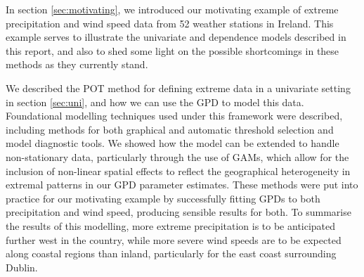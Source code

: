 \documentclass{article}
\numberwithin{equation}{section}
\begin{document}
In section \ref{sec:motivating}, we introduced our motivating example of extreme precipitation and wind speed data from 52 weather stations in Ireland. 
This example serves to illustrate the univariate and dependence models described in this report, and also to shed some light on the possible shortcomings in these methods as they currently stand.

We described the POT method for defining extreme data in a univariate setting in section \ref{sec:uni}, and how we can use the GPD to model this data. 
Foundational modelling techniques used under this framework were described, including methods for both graphical and automatic threshold selection and model diagnostic tools. 
We showed how the model can be extended to handle non-stationary data, particularly through the use of GAMs, which allow for the inclusion of non-linear spatial effects to reflect the  geographical heterogeneity in extremal patterns in our GPD parameter estimates. 
These methods were put into practice for our motivating example by successfully fitting GPDs to both precipitation and wind speed, producing sensible results for both. 
To summarise the results of this modelling, more extreme precipitation is to be anticipated further west in the country, while more severe wind speeds are to be expected along coastal regions than inland, particularly for the east coast surrounding Dublin. 
\end{document}
